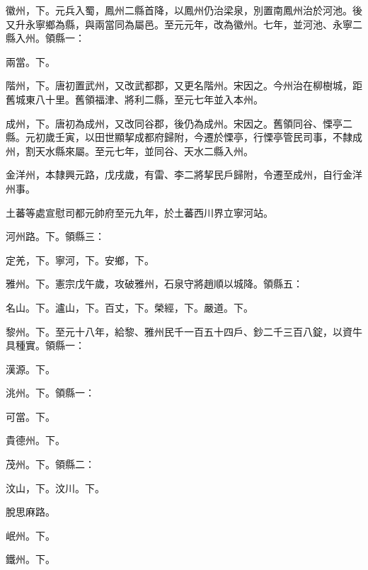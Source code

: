 \begin{pinyinscope}
 徽州，下。元兵入蜀，鳳州二縣首降，以鳳州仍治梁泉，別置南鳳州治於河池。後又升永寧鄉為縣，與兩當同為屬邑。至元元年，改為徽州。七年，並河池、永寧二縣入州。領縣一：



 兩當。下。



 階州，下。唐初置武州，又改武都郡，又更名階州。宋因之。今州治在柳樹城，距舊城東八十里。舊領福津、將利二縣，至元七年並入本州。



 成州，下。唐初為成州，又改同谷郡，後仍為成州。宋因之。舊領同谷、慄亭二縣。元初歲壬寅，以田世顯挈成都府歸附，今遷於慄亭，行慄亭管民司事，不隸成州，割天水縣來屬。至元七年，並同谷、天水二縣入州。



 金洋州，本隸興元路，戊戌歲，有雷、李二將挈民戶歸附，令遷至成州，自行金洋州事。



 土蕃等處宣慰司都元帥府至元九年，於土蕃西川界立寧河站。



 河州路。下。領縣三：



 定羌，下。寧河，下。安鄉，下。



 雅州。下。憲宗戊午歲，攻破雅州，石泉守將趙順以城降。領縣五：



 名山。下。瀘山，下。百丈，下。榮經，下。嚴道。下。



 黎州。下。至元十八年，給黎、雅州民千一百五十四戶、鈔二千三百八錠，以資牛具種實。領縣一：



 漢源。下。



 洮州。下。領縣一：



 可當。下。



 貴德州。下。



 茂州。下。領縣二：



 汶山，下。汶川。下。



 脫思麻路。



 岷州。下。



 鐵州。下。




\end{pinyinscope}

